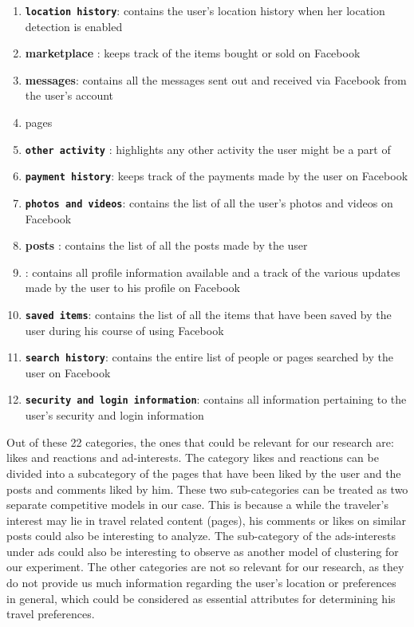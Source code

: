 \begin{enumerate}[i]
   \item \textbf{\texttt{location history}}: contains the user's location history when her location detection is enabled
   \item \textbf{marketplace} : keeps track of the items bought or sold on Facebook
   \item \textbf{messages}: contains all the messages sent out and received via Facebook from the user's account
   \item pages
   \item \textbf{\texttt{other activity}} : highlights any other activity the user might be a part of
   \item \textbf{\texttt{payment history}}: keeps track of the payments made by the user on Facebook
   \item \textbf{\texttt{photos and videos}}: contains the list of all the user's photos and videos on Facebook
   \item \textbf{posts} : contains the list of all the posts made by the user
   \item \textbf{}: contains all profile information available and a track of the various updates made by the user to his profile on Facebook
   \item \textbf{\texttt{saved items}}: contains the list of all the items that have been saved by the user during his course of using Facebook
   \item \textbf{\texttt{search history}}: contains the entire list of people or pages searched by the user on Facebook
   \item \textbf{\texttt{security and login information}}: contains all information pertaining to the user's security and login information
  
\end{enumerate}

Out of these 22 categories, the ones that could be relevant for our research are: likes and reactions and  ad-interests. 
The category likes and reactions can be divided into a subcategory of the pages that have been liked by the user and the posts and comments liked by him. These two sub-categories can be treated as two separate competitive models in our case. This is because a while the traveler's interest may lie in travel related content (pages), his comments or likes on similar posts could also be interesting to analyze. The sub-category of the ads-interests under ads could also be interesting to observe as another model of clustering for our experiment. The other categories are not so relevant for our research, as they do not provide us much information regarding the user's location or preferences in general, which could be considered as essential attributes for determining his travel preferences. 

